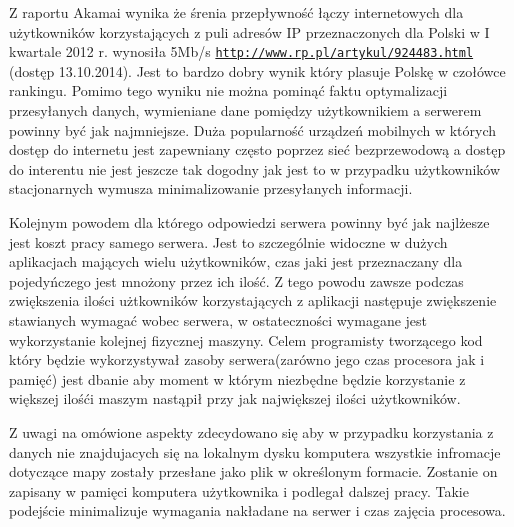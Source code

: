 Z raportu Akamai wynika że śrenia przepływność łączy internetowych dla użytkowników korzystających z puli adresów IP przeznaczonych dla Polski w I kwartale 2012 r. wynosiła 5Mb/s  \underline{\texttt{http://www.rp.pl/artykul/924483.html}} (dostęp 13.10.2014). Jest to bardzo dobry wynik który plasuje Polskę w czołówce rankingu. Pomimo tego wyniku nie można pominąć faktu optymalizacji przesyłanych danych, wymieniane dane pomiędzy użytkownikiem a serwerem powinny być jak najmniejsze. Duża popularność urządzeń mobilnych w których dostęp do internetu jest zapewniany często poprzez sieć bezprzewodową a dostęp do interentu nie jest jeszcze tak dogodny jak jest to w przypadku użytkowników stacjonarnych  wymusza minimalizowanie przesyłanych informacji.

Kolejnym powodem dla którego odpowiedzi serwera powinny być jak najlżesze jest koszt pracy samego serwera. Jest to szczególnie widoczne w dużych aplikacjach mających wielu użytkowników, czas jaki jest przeznaczany dla pojedyńczego jest mnożony przez ich ilość. Z tego powodu zawsze podczas zwiększenia ilości użtkowników korzystających z aplikacji następuje zwiększenie stawianych wymagać wobec serwera, w ostateczności wymagane jest wykorzystanie kolejnej fizycznej maszyny. Celem programisty tworzącego kod który będzie wykorzystywał zasoby serwera(zarówno jego czas procesora jak i pamięć) jest dbanie aby moment w którym niezbędne będzie korzystanie z większej ilośći maszym nastąpił przy jak największej ilości użytkowników.

Z uwagi na omówione aspekty zdecydowano się aby w przypadku korzystania z danych nie znajdujacych się na lokalnym dysku komputera wszystkie infromacje dotyczące mapy zostały przesłane jako plik w określonym formacie. Zostanie on zapisany w pamięci komputera użytkownika i podlegał dalszej pracy. Takie podejście minimalizuje wymagania nakładane na serwer i czas zajęcia procesowa.

\newpage
